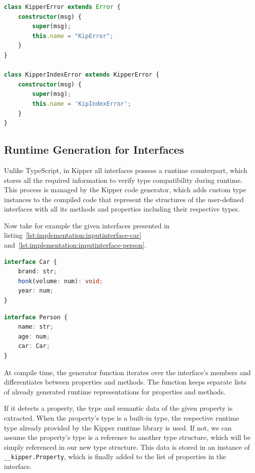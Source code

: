 \begin{lstlisting}[language=Typescript,caption=Kipper error types,label=lst:implementation:kippererrortypes]
class KipperError extends Error {
	constructor(msg) {
		super(msg);
		this.name = "KipError";
	}
}

class KipperIndexError extends KipperError {
	constructor(msg) { 
		super(msg); 
		this.name = 'KipIndexError'; 
	} 
}
\end{lstlisting}

\subsection{Runtime Generation for Interfaces}

Unlike TypeScript, in Kipper all interfaces possess a runtime counterpart, which stores all the required information to verify type compatibility during runtime. This process is managed by the Kipper code generator, which adds custom type instances to the compiled code that represent the structures of the user-defined interfaces with all its methods and properties including their respective types.

Now take for example the given interfaces presented in listing~\ref{lst:implementation:inputinterface-car} and~\ref{lst:implementation:inputinterface-person}.

\begin{lstlisting}[language=Typescript,caption=Example interface \lstinline|Car| in the Kipper language,label=lst:implementation:inputinterface-car]
interface Car {
	brand: str;
	honk(volume: num): void;
	year: num;
}
\end{lstlisting}

\begin{lstlisting}[language=Typescript,caption=Example interface \lstinline|Person| in the Kipper language including a reference to a different interface,label=lst:implementation:inputinterface-person]
interface Person {
	name: str;
	age: num;
	car: Car;
}
\end{lstlisting}

At compile time, the generator function iterates over the interface's members and differentiates between properties and methods. The function keeps separate lists of already generated runtime representations for properties and methods.

If it detects a property, the type and semantic data of the given property is extracted. When the property's type is a built-in type, the respective runtime type already provided by the Kipper runtime library is used. If not, we can assume the property's type is a reference to another type structure, which will be simply referenced in our new type structure. This data is stored in an instance of \lstinline|__kipper.Property|, which is finally added to the list of properties in the interface.

